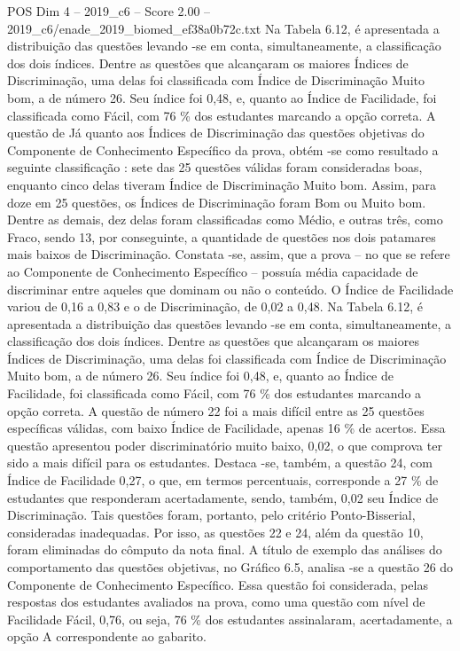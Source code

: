 \begin{textsample}{POS Dim 4 – 2019\_c6 – Score 2.00 – 2019\_c6/enade\_2019\_biomed\_ef38a0b72c.txt}
Na Tabela 6.12, é apresentada a distribuição das questões levando -se em conta, simultaneamente, a classificação dos dois índices.
Dentre as questões que alcançaram os maiores Índices de Discriminação, uma delas foi classificada com Índice de Discriminação Muito bom, a de número 26.
Seu índice foi 0,48, e, quanto ao Índice de Facilidade, foi classificada como Fácil, com 76 \% dos estudantes marcando a opção correta.
A questão de Já quanto aos Índices de Discriminação das questões objetivas do Componente de Conhecimento Específico da prova, obtém -se como resultado a seguinte classificação : sete das 25 questões válidas foram consideradas boas, enquanto cinco delas tiveram Índice de Discriminação Muito bom.
Assim, para doze em 25 questões, os Índices de Discriminação foram Bom ou Muito bom.
Dentre as demais, dez delas foram classificadas como Médio, e outras três, como Fraco, sendo 13, por conseguinte, a quantidade de questões nos dois patamares mais baixos de Discriminação.
Constata -se, assim, que a prova – no que se refere ao Componente de Conhecimento Específico – possuía média capacidade de discriminar entre aqueles que dominam ou não o conteúdo.
O Índice de Facilidade variou de 0,16 a 0,83 e o de Discriminação, de 0,02 a 0,48.
Na Tabela 6.12, é apresentada a distribuição das questões levando -se em conta, simultaneamente, a classificação dos dois índices.
Dentre as questões que alcançaram os maiores Índices de Discriminação, uma delas foi classificada com Índice de Discriminação Muito bom, a de número 26.
Seu índice foi 0,48, e, quanto ao Índice de Facilidade, foi classificada como Fácil, com 76 \% dos estudantes marcando a opção correta.
A questão de número 22 foi a mais difícil entre as 25 questões específicas válidas, com baixo Índice de Facilidade, apenas 16 \% de acertos.
Essa questão apresentou poder discriminatório muito baixo, 0,02, o que comprova ter sido a mais difícil para os estudantes.
Destaca -se, também, a questão 24, com Índice de Facilidade 0,27, o que, em termos percentuais, corresponde a 27 \% de estudantes que responderam acertadamente, sendo, também, 0,02 seu Índice de Discriminação.
Tais questões foram, portanto, pelo critério Ponto-Bisserial, consideradas inadequadas.
Por isso, as questões 22 e 24, além da questão 10, foram eliminadas do cômputo da nota final.
A título de exemplo das análises do comportamento das questões objetivas, no Gráfico 6.5, analisa -se a questão 26 do Componente de Conhecimento Específico.
Essa questão foi considerada, pelas respostas dos estudantes avaliados na prova, como uma questão com nível de Facilidade Fácil, 0,76, ou seja, 76 \% dos estudantes assinalaram, acertadamente, a opção A correspondente ao gabarito.

\end{textsample}
